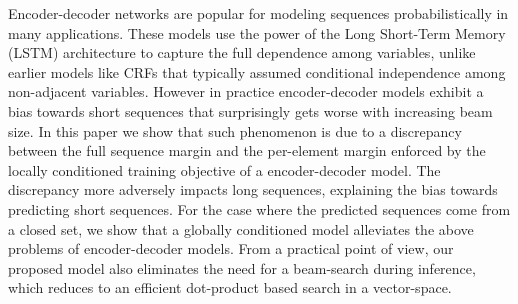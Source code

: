 Encoder-decoder networks are popular for modeling sequences  probabilistically in many applications.  These models use the power of the Long Short-Term Memory (LSTM) architecture to capture the full dependence among variables, unlike earlier models like CRFs that typically assumed conditional independence among non-adjacent variables.  However in practice encoder-decoder models exhibit a bias towards short sequences that surprisingly gets worse with increasing beam size. In this paper we show that such phenomenon is due to a discrepancy between the full sequence margin and the per-element margin enforced by the locally conditioned training objective of a encoder-decoder model. The discrepancy more adversely impacts long sequences, explaining the bias towards predicting short sequences. For the case where the predicted sequences come from a closed set, we show that a globally conditioned model alleviates the above problems of encoder-decoder models. From a practical point of view, our proposed model also eliminates the need for a beam-search during inference, which reduces to an efficient dot-product based search in a vector-space.
